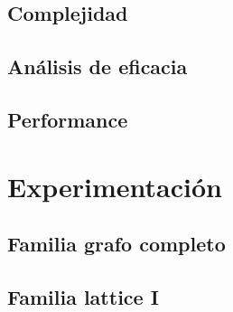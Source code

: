 \documentclass[a4paper, 10pt, twoside]{article}
\begin{document}
\subsection{Complejidad}
\subsection{Análisis de eficacia}
\subsection{Performance}




\newpage


\section{Experimentación}


\subsection{Familia grafo completo}

\begin{figure}[H]
	
\end{figure}

\begin{figure}[H]
	
\end{figure}


\subsection{Familia lattice I}

\begin{figure}[H]
	
\end{figure}

\begin{figure}[H]
	
\end{figure}
\end{document}

